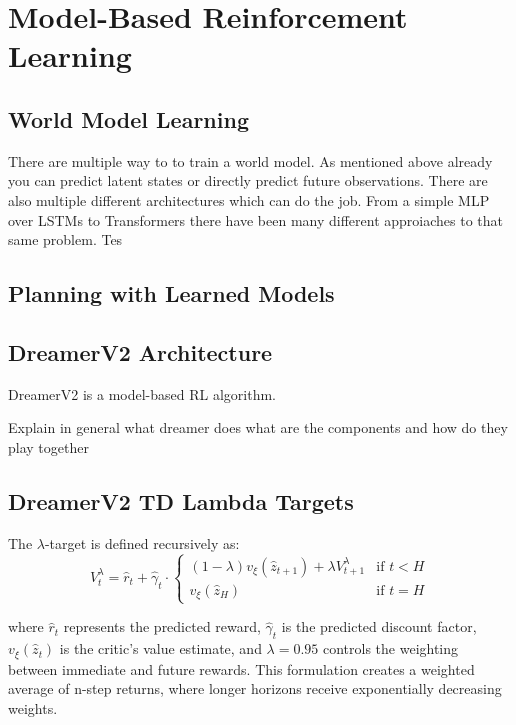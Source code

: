 \documentclass[
	english,
	ruledheaders=section,
	class=report,
	thesis={type=master},
	accentcolor=9c,
	custommargins=true,
	marginpar=false,
	parskip=half-,
	fontsize=11pt,
]{tudapub}
\begin{document}
\section{Model-Based Reinforcement Learning}
\label{sec:mbrl}

\subsection{World Model Learning}
\label{subsec:world_models}
There are multiple way to to train a world model. As mentioned above already you can predict latent states or directly predict future observations. There are also multiple different architectures which can do the job. From a simple MLP over LSTMs to Transformers there have been many different approiaches to that same problem. Tes

\subsection{Planning with Learned Models}
\label{subsec:planning}

\subsection{DreamerV2 Architecture}
\label{subsec:dreamerv2_arch}
DreamerV2 \cite{hafner2019dreamer} is a model-based RL algorithm.

Explain in general what dreamer does
what are the components and how do they play together

\subsection{DreamerV2 TD Lambda Targets}
\label{subsec:td_lambda}

The $\lambda$-target is defined recursively as:
\begin{equation}
	V^{\lambda}_t = \hat{r}_t + \hat{\gamma}_t \cdot \begin{cases}
		(1 - \lambda)v_\xi(\hat{z}_{t+1}) + \lambda V^{\lambda}_{t+1} & \text{if } t < H \\
		v_\xi(\hat{z}_H)                                              & \text{if } t = H
	\end{cases}
\end{equation}

where $\hat{r}_t$ represents the predicted reward, $\hat{\gamma}_t$ is the predicted discount factor, $v_\xi(\hat{z}_t)$ is the critic's value estimate, and $\lambda = 0.95$ controls the weighting between immediate and future rewards. This formulation creates a weighted average of n-step returns, where longer horizons receive exponentially decreasing weights.
\end{document}

